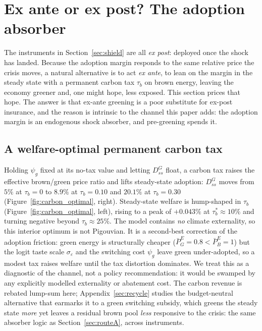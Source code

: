 \section{Ex ante or ex post? The adoption absorber}
\label{sec:exante}

The instruments in Section~\ref{sec:shield} are all \emph{ex post}: deployed once
the shock has landed. Because the adoption margin responds to the same relative
price the crisis moves, a natural alternative is to act \emph{ex ante}, to lean
on the margin in the steady state with a permanent carbon tax $\tau_b$ on brown
energy, leaving the economy greener and, one might hope, less exposed. This
section prices that hope. The answer is that ex-ante greening is a poor substitute
for ex-post insurance, and the reason is intrinsic to the channel this paper adds:
the adoption margin is an endogenous shock absorber, and pre-greening spends it.

\subsection{A welfare-optimal permanent carbon tax}
\label{sec:carbontax}

Holding $\psi_g$ fixed at its no-tax value and letting $D^{G}_{ss}$ float, a
carbon tax raises the effective brown/green price ratio and lifts steady-state
adoption: $D^{G}_{ss}$ moves from $5\%$ at $\tau_b=0$ to $8.9\%$ at $\tau_b=0.10$
and $20.1\%$ at $\tau_b=0.30$ (Figure~\ref{fig:carbon_optimal},
right). Steady-state welfare is hump-shaped in $\tau_b$
(Figure~\ref{fig:carbon_optimal}, left), rising to a peak of $+0.043\%$
at $\tau_b^{*}\approx 10\%$ and turning negative beyond
$\tau_b\approx 25\%$. The model contains \emph{no} climate
externality, so this interior optimum is not Pigouvian. It is a second-best
correction of the adoption friction: green energy is structurally cheaper
($\bar P^{E}_{G}=0.8<\bar P^{E}_{B}=1$) but the logit taste scale
$\sigma_\varepsilon$ and the switching cost $\psi_g$ leave green under-adopted, so
a modest tax raises welfare until the tax distortion dominates. We treat this as a
diagnostic of the channel, not a policy recommendation: it would be swamped by
any explicitly modelled externality or abatement cost. The carbon revenue is
rebated lump-sum here; Appendix~\ref{sec:recycle} studies the budget-neutral
alternative that earmarks it to a green switching subsidy, which greens the steady
state \emph{more} yet leaves a residual brown pool \emph{less} responsive to the
crisis: the same absorber logic as Section~\ref{sec:routeA}, across instruments.

